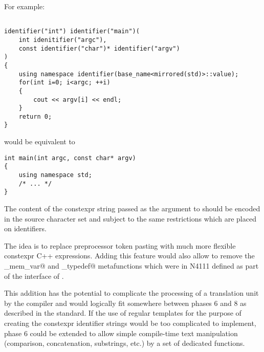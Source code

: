 For example:

\begin{verbatim}

identifier("int") identifier("main")(
	int idenitifier("argc"),
	const identifier("char")* identifier("argv")
)
{
	using namespace identifier(base_name<mirrored(std)>::value);
	for(int i=0; i<argc; ++i)
	{
		cout << argv[i] << endl;
	}
	return 0;
}

\end{verbatim}

would be equivalent to

\begin{verbatim}
int main(int argc, const char* argv)
{
	using namespace std;
	/* ... */
}
\end{verbatim}

The content of the constexpr string passed as the argument to \verb@identifier@
should be encoded in the source character set and subject to the same restrictions
which are placed on identifiers.

The idea is to replace preprocessor token pasting with much more flexible constexpr C++ expressions.
Adding this feature would also allow to remove the \verb@named_mem_var@ and
\verb@named_typedef@ metafunctions which were in N4111 defined as part of
the interface of .

This addition has the potential to complicate the processing of a translation unit
by the compiler and would logically fit somewhere between phases 6 and 8 as described
in the standard. If the use of regular templates for the purpose of creating the
constexpr identifier strings would be too complicated to implement, phase 6 could
be extended to allow simple compile-time text manipulation (comparison, concatenation,
substrings, etc.) by a set of dedicated functions.

